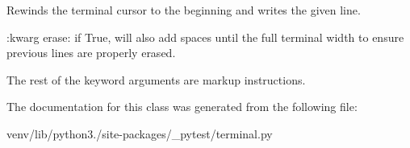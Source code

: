 \begin{DoxyVerb}Rewinds the terminal cursor to the beginning and writes the given line.

:kwarg erase: if True, will also add spaces until the full terminal width to ensure
    previous lines are properly erased.

The rest of the keyword arguments are markup instructions.
\end{DoxyVerb}
 

The documentation for this class was generated from the following file\+:\begin{DoxyCompactItemize}
\item 
venv/lib/python3./site-\/packages/\+\_\+pytest/terminal.\+py\end{DoxyCompactItemize}
